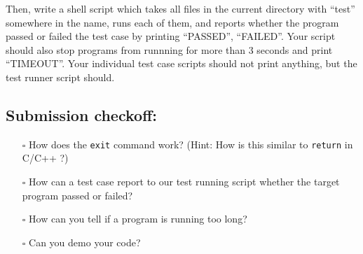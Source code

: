 \documentclass{article}
\begin{document}
\noindent
Then, write a shell script which takes all files in the current directory with
``test'' somewhere in the name, runs each of them, and reports whether the
program passed or failed the test case by printing ``PASSED'', ``FAILED''. Your
script should also stop programs from runnning for more than 3 seconds and
print ``TIMEOUT''. Your individual test case scripts should not print anything,
but the test runner script should.


\subsection*{Submission checkoff:}
\begin{itemize}
  \item[$\square$] How does the \texttt{exit} command work? (Hint: How is this similar to
    \texttt{return} in C/C++ ?)
  \item[$\square$] How can a test case report to our test running script whether the target program passed or failed?
  \item[$\square$] How can you tell if a program is running too long?
  \item[$\square$] Can you demo your code?
\end{itemize}
\end{document}
